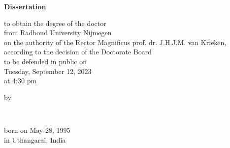 \begin{titlepage}
    \begin{center}


        \vspace*{2\bigskipamount}

        {\makeatletter
            \titlestyle\bfseries\LARGE\@title
            \makeatother}

        {\makeatletter
            \ifx\@subtitle\undefined\else
                \bigskip
                \titlefont\titleshape\Large\@subtitle
            \fi
            \makeatother}

        \vfill


        {\Large\titlefont\bfseries Dissertation}

        \bigskip
        \bigskip

        to obtain the degree of the doctor\\
        from Radboud University Nijmegen\\
        on the authority of the Rector Magnificus prof. dr. J.H.J.M. van Krieken,\\
        according to the decision of the Doctorate Board\\
        to be defended in public on\\

        \bigskip
        Tuesday, September 12, 2023\\
        at 4:30 pm
        \bigskip
        \bigskip

        by

        \bigskip
        \bigskip

        \makeatletter
        {\Large\titlefont\bfseries\@firstnames\ \@lastname}
        \makeatother

        \bigskip
        \bigskip

        born on May 28, 1995\\
        in Uthangarai, India\\

        \vspace*{2\bigskipamount}


\end{center}
\end{titlepage}
